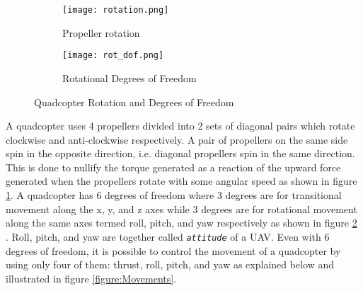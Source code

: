 \documentclass[10pt, a4paper]{article}
\newcommand{\textFunc}[1]{\texttt{\textit{#1}}}
\begin{document}
    \begin{figure}[hbt!]
        \centering
        \begin{subfigure}[b]{0.51\textwidth}
            \centering
            \texttt{[image: rotation.png]}
            \caption{Propeller rotation}
            \label{figure:rotate}
        \end{subfigure}
        \hfill
        \begin{subfigure}[b]{0.41\textwidth}
            \centering
            \texttt{[image: rot\_dof.png]}
            \caption{Rotational Degrees of Freedom}
            \label{figure:rot_DOF}        
        \end{subfigure}
        \caption{Quadcopter Rotation and Degrees of Freedom \cite{book:quan2017-movements}}
        \label{figure:DOF}
    \end{figure}

    A quadcopter uses 4 propellers divided into 2 sets of diagonal pairs which rotate clockwise and anti-clockwise respectively. A pair of propellers on the same side spin in the opposite direction, i.e. diagonal propellers spin in the same direction. This is done to nullify the torque generated as a reaction of the upward force generated when the propellers rotate with some angular speed as shown in figure \ref{figure:rotate}. A quadcopter has 6 degrees of freedom where 3 degrees are for transitional movement along the x, y, and z axes while 3 degrees are for rotational movement along the same axes termed roll, pitch, and yaw respectively as shown in figure \ref{figure:rot_DOF} \cite{article:pid-controller-IIJEM}. Roll, pitch, and yaw are together called \textFunc{attitude} of a UAV. Even with $6$ degrees of freedom, it is possible to control the movement of a quadcopter by using only four of them: thrust, roll, pitch, and yaw \cite{book:quan2017-movements} as explained below and illustrated in figure \ref{figure:Movements}.
\end{document}
